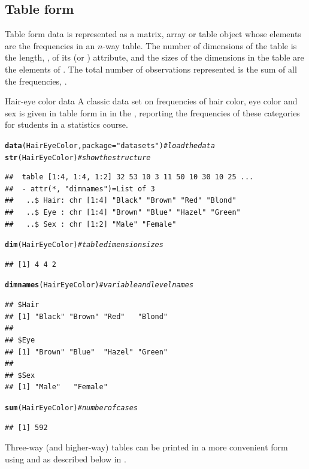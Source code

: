 \documentclass[11pt]{book}\usepackage[]{graphicx}\usepackage[]{color}
\makeatletter
\newcommand{\hlstr}[1]{\textcolor[rgb]{0.192,0.494,0.8}{#1}}%
\newcommand{\hlcom}[1]{\textcolor[rgb]{0.678,0.584,0.686}{\textit{#1}}}%
\newcommand{\hlstd}[1]{\textcolor[rgb]{0.345,0.345,0.345}{#1}}%
\newcommand{\hlkwc}[1]{\textcolor[rgb]{0.333,0.667,0.333}{#1}}%
\newcommand{\hlkwd}[1]{\textcolor[rgb]{0.737,0.353,0.396}{\textbf{#1}}}%
\newenvironment{kframe}{%
 \def\at@end@of@kframe{}%
 \ifinner\ifhmode%
  \def\at@end@of@kframe{\end{minipage}}%
  \begin{minipage}{\columnwidth}%
 \fi\fi%
 \def\FrameCommand##1{\hskip\@totalleftmargin \hskip-\fboxsep
 \colorbox{shadecolor}{##1}\hskip-\fboxsep
     \hskip-\linewidth \hskip-\@totalleftmargin \hskip\columnwidth}%
 \MakeFramed {\advance\hsize-\width
   \@totalleftmargin\z@ \linewidth\hsize
   \@setminipage}}%
 {\par\unskip\endMakeFramed%
 \at@end@of@kframe}
\newenvironment{knitrout}{}{} %
\renewenvironment{knitrout}{\small\renewcommand{\baselinestretch}{.85}}{} %
\makeatother
\begin{document}
\subsection{Table form}
Table form data is represented as a matrix, array or table object
whose elements are the frequencies in an $n$-way table.
The number of dimensions of the table is the length, 
, of its
 (or ) attribute, and the sizes of the
dimensions in the table are the elements of .
The total number of observations represented is the sum of
all the frequencies, .

\begin{Example}[ch2-hec]{Hair-eye color data}
A classic data set on frequencies of hair color, eye color and
sex is given in table form in  in the 
, reporting the frequencies of these
categories for  students in
a statistics course.
\begin{knitrout}
\color{fgcolor}\begin{kframe}
\begin{alltt}
\hlkwd{data}\hlstd{(HairEyeColor,} \hlkwc{package}\hlstd{=}\hlstr{"datasets"}\hlstd{)}    \hlcom{# load the data}
\hlkwd{str}\hlstd{(HairEyeColor)}                \hlcom{# show the structure}
\end{alltt}
\begin{verbatim}
##  table [1:4, 1:4, 1:2] 32 53 10 3 11 50 10 30 10 25 ...
##  - attr(*, "dimnames")=List of 3
##   ..$ Hair: chr [1:4] "Black" "Brown" "Red" "Blond"
##   ..$ Eye : chr [1:4] "Brown" "Blue" "Hazel" "Green"
##   ..$ Sex : chr [1:2] "Male" "Female"
\end{verbatim}
\begin{alltt}
\hlkwd{dim}\hlstd{(HairEyeColor)}                \hlcom{# table dimension sizes}
\end{alltt}
\begin{verbatim}
## [1] 4 4 2
\end{verbatim}
\begin{alltt}
\hlkwd{dimnames}\hlstd{(HairEyeColor)}           \hlcom{# variable and level names}
\end{alltt}
\begin{verbatim}
## $Hair
## [1] "Black" "Brown" "Red"   "Blond"
## 
## $Eye
## [1] "Brown" "Blue"  "Hazel" "Green"
## 
## $Sex
## [1] "Male"   "Female"
\end{verbatim}
\begin{alltt}
\hlkwd{sum}\hlstd{(HairEyeColor)}                \hlcom{# number of cases}
\end{alltt}
\begin{verbatim}
## [1] 592
\end{verbatim}
\end{kframe}
\end{knitrout}

Three-way (and higher-way) tables can be printed in a more convenient
form using  and  as described below
in .
\end{Example}
\end{document}
